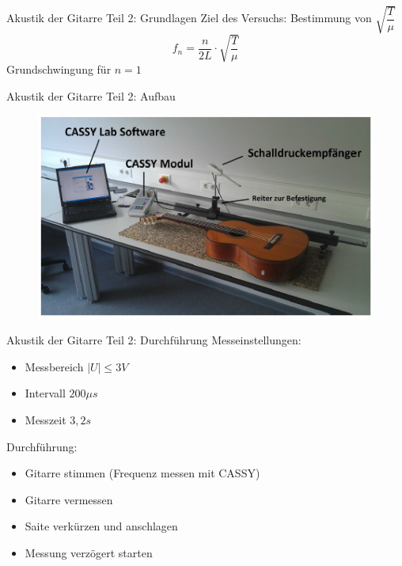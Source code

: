 \documentclass[12pt]{beamer}
\begin{document}
\begin{frame}{Akustik der Gitarre Teil 2: Grundlagen}
	Ziel des Versuchs: Bestimmung von $\sqrt{\dfrac{T}{\mu}}$ \\
	\[f_n = \dfrac{n}{2L} \cdot \sqrt{\dfrac{T}{\mu}}\]
	Grundschwingung für $n = 1$
\end{frame}

\begin{frame}{Akustik der Gitarre Teil 2: Aufbau}
	\begin{figure}
		\includegraphics[scale=0.8]{Bilder/AufbauAkustikGitarre.PNG}
		\centering
	\end{figure}
\end{frame}

\begin{frame}{Akustik der Gitarre Teil 2: Durchführung}
	Messeinstellungen:
	\begin{itemize}
		\item Messbereich $|U| \leq 3V$
		\item Intervall $200 \mu s$
		\item Messzeit $3,2s$
	\end{itemize}
	Durchführung:
	\begin{itemize}
		\item Gitarre stimmen (Frequenz messen mit CASSY)
		\item Gitarre vermessen
		\item Saite verkürzen und anschlagen
		\item Messung verzögert starten
	\end{itemize}
\end{frame}
\end{document}
